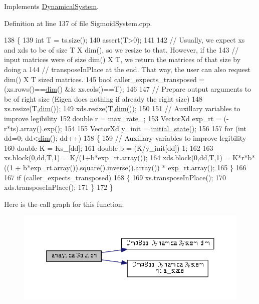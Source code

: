 Implements \hyperlink{classDmpBbo_1_1DynamicalSystem_ab6092038efc51ebd122e7c0878f6557d}{Dynamical\+System}.



Definition at line 137 of file Sigmoid\+System.\+cpp.


\begin{DoxyCode}
138 \{
139   \textcolor{keywordtype}{int} T = ts.size();
140   assert(T>0);
141 
142   \textcolor{comment}{// Usually, we expect xs and xds to be of size T X dim(), so we resize to that. However, if the}
143   \textcolor{comment}{// input matrices were of size dim() X T, we return the matrices of that size by doing a }
144   \textcolor{comment}{// transposeInPlace at the end. That way, the user can also request dim() X T sized matrices.}
145   \textcolor{keywordtype}{bool} caller\_expects\_transposed = (xs.rows()==\hyperlink{group__DynamicalSystems_ga6f628f7f4ed9d77bf69f5b8560b98f18}{dim}() && xs.cols()==T);
146 
147   \textcolor{comment}{// Prepare output arguments to be of right size (Eigen does nothing if already the right size)}
148   xs.resize(T,\hyperlink{group__DynamicalSystems_ga6f628f7f4ed9d77bf69f5b8560b98f18}{dim}());
149   xds.resize(T,\hyperlink{group__DynamicalSystems_ga6f628f7f4ed9d77bf69f5b8560b98f18}{dim}());
150 
151   \textcolor{comment}{// Auxillary variables to improve legibility}
152   \textcolor{keywordtype}{double} r = max\_rate\_;
153   VectorXd exp\_rt = (-r*ts).array().exp();
154   
155   VectorXd y\_init = \hyperlink{group__DynamicalSystems_ga4c7f24e7deec1629548a075015bdc693}{initial\_state}();
156       
157   \textcolor{keywordflow}{for} (\textcolor{keywordtype}{int} dd=0; dd<\hyperlink{group__DynamicalSystems_ga6f628f7f4ed9d77bf69f5b8560b98f18}{dim}(); dd++)
158   \{
159     \textcolor{comment}{// Auxillary variables to improve legibility}
160     \textcolor{keywordtype}{double} K = Ks\_[dd];
161     \textcolor{keywordtype}{double} b = (K/y\_init[dd])-1;
162         
163     xs.block(0,dd,T,1)  = K/(1+b*exp\_rt.array());
164     xds.block(0,dd,T,1) = K*r*b*((1 + b*exp\_rt.array()).square().inverse().array()) * exp\_rt.array();
165   \}
166   
167   \textcolor{keywordflow}{if} (caller\_expects\_transposed)
168   \{
169     xs.transposeInPlace();
170     xds.transposeInPlace();
171   \}
172 \}
\end{DoxyCode}


Here is the call graph for this function\+:
\nopagebreak
\begin{figure}[H]
\begin{center}
\leavevmode
\includegraphics[width=350pt]{classDmpBbo_1_1SigmoidSystem_ab6600b58b35bc9e66673d16f68e2e919_cgraph}
\end{center}
\end{figure}


